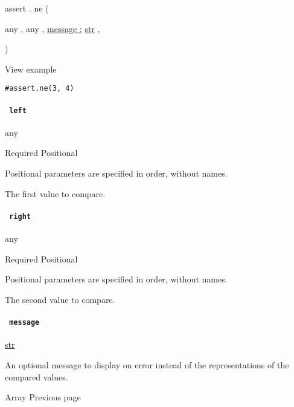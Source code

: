 assert { . } { ne } (

{ { any } , } { { any } , } {
\hyperref[definitions-ne-parameters-message]{message :}
\href{/docs/reference/foundations/str/}{str} , }

)


View example

\begin{verbatim}
#assert.ne(3, 4)
\end{verbatim}

\paragraph{\texorpdfstring{\texttt{\ left\ }}{ left }}\label{definitions-ne-left}

{ any }

{Required} {{ Positional }}

\label{definitions-ne-left-positional-tooltip}
Positional parameters are specified in order, without names.

The first value to compare.

\paragraph{\texorpdfstring{\texttt{\ right\ }}{ right }}\label{definitions-ne-right}

{ any }

{Required} {{ Positional }}

\label{definitions-ne-right-positional-tooltip}
Positional parameters are specified in order, without names.

The second value to compare.

\paragraph{\texorpdfstring{\texttt{\ message\ }}{ message }}\label{definitions-ne-message}

\href{/docs/reference/foundations/str/}{str}

An optional message to display on error instead of the representations
of the compared values.

\href{/docs/reference/foundations/array/}{\pandocbounded{}}

{ Array } { Previous page }

